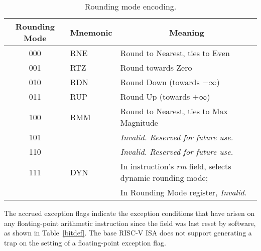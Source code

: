 \begin{table}[htp]
\begin{small}
\begin{center}
\begin{tabular}{ccl}
\hline
\multicolumn{1}{|c|}{Rounding Mode} &
\multicolumn{1}{c|}{Mnemonic} &
\multicolumn{1}{c|}{Meaning} \\
\hline
\multicolumn{1}{|c|}{000} &
\multicolumn{1}{l|}{RNE} &
\multicolumn{1}{l|}{Round to Nearest, ties to Even}\\
\hline
\multicolumn{1}{|c|}{001} &
\multicolumn{1}{l|}{RTZ} &
\multicolumn{1}{l|}{Round towards Zero}\\
\hline
\multicolumn{1}{|c|}{010} &
\multicolumn{1}{l|}{RDN} &
\multicolumn{1}{l|}{Round Down (towards $-\infty$)}\\
\hline
\multicolumn{1}{|c|}{011} &
\multicolumn{1}{l|}{RUP} &
\multicolumn{1}{l|}{Round Up (towards $+\infty$)}\\
\hline
\multicolumn{1}{|c|}{100} &
\multicolumn{1}{l|}{RMM} &
\multicolumn{1}{l|}{Round to Nearest, ties to Max Magnitude}\\
\hline
\multicolumn{1}{|c|}{101} &
\multicolumn{1}{l|}{} &
\multicolumn{1}{l|}{\em Invalid.  Reserved for future use.}\\
\hline
\multicolumn{1}{|c|}{110} &
\multicolumn{1}{l|}{} &
\multicolumn{1}{l|}{\em Invalid.  Reserved for future use.}\\
\hline
\multicolumn{1}{|c|}{111} &
\multicolumn{1}{l|}{DYN} &
\multicolumn{1}{l|}{In instruction's {\em rm} field, selects dynamic rounding mode;}\\
\multicolumn{1}{|c|}{} &
\multicolumn{1}{l|}{} &
\multicolumn{1}{l|}{In Rounding Mode register, {\em Invalid}.}\\
\hline
\end{tabular}
\end{center}
\end{small}
\caption{Rounding mode encoding.}
\label{rm}
\end{table}

The accrued exception flags indicate the exception conditions that
have arisen on any floating-point arithmetic instruction since the
field was last reset by software, as shown in Table~\ref{bitdef}.
The base RISC-V ISA
does not support generating a trap on the setting of a floating-point
exception flag.

